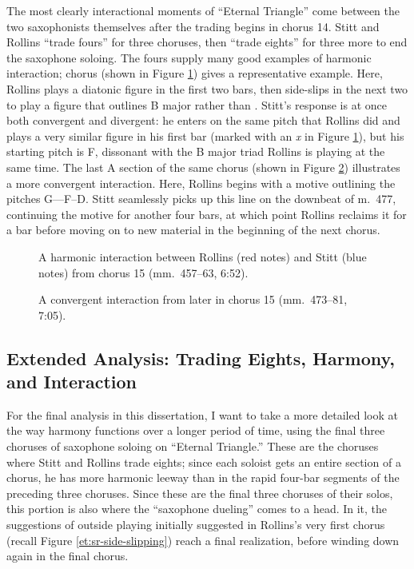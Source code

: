 The most clearly interactional moments of ``Eternal Triangle'' come between
the two saxophonists themselves after the trading begins in chorus 14. Stitt
and Rollins ``trade fours'' for three choruses, then ``trade eights'' for
three more to end the saxophone soloing. The fours supply many good examples
of harmonic interaction; chorus  (shown in Figure
\ref{et:trading-c15-divergent}) gives a representative example. Here, Rollins
plays a diatonic figure in the first two bars, then side-slips in the next two
to play a figure that outlines B major rather than \Bflat. Stitt's response is
at once both convergent and divergent: he enters on the same pitch that
Rollins did and plays a very similar figure in his first bar (marked with an
\textit{x} in Figure \ref{et:trading-c15-divergent}), but his starting pitch
is F\nat, dissonant with the B major triad Rollins is playing at the same
time. The last A section of the same chorus (shown in Figure
\ref{et:trading-c15-convergent}) illustrates a more convergent interaction.
Here, Rollins begins with a motive outlining the pitches G--\Gflat--F--D.
Stitt seamlessly picks up this line on the downbeat of m.~477, continuing the
motive for another four bars, at which point Rollins reclaims it for a bar
before moving on to new material in the beginning of the next chorus.

\vspace{5em}
\begin{figure}[htb]
  \caption[A harmonic interaction between Rollins and Stitt from chorus 15.]{%
    A harmonic interaction between Rollins (red notes) and Stitt (blue notes)
    from chorus 15 (mm.~457--63, 6:52).}
  \label{et:trading-c15-divergent}
\end{figure}

\begin{figure}[htb]
  \caption[A convergent interaction between Rollins and Stitt from later in
  chorus 15.]{%
    A convergent interaction from later in chorus 15 (mm.~473--81, 7:05).}
  \label{et:trading-c15-convergent}
\end{figure}

\newpage
\FloatBarrier
\subsection{Extended Analysis: Trading Eights, Harmony, and Interaction}

For the final analysis in this dissertation, I want to take a more detailed
look at the way harmony functions over a longer period of time, using the
final three choruses of saxophone soloing on ``Eternal Triangle.'' These are
the choruses where Stitt and Rollins trade eights; since each soloist gets an
entire section of a chorus, he has more harmonic leeway than in the rapid
four-bar segments of the preceding three choruses. Since these are the final
three choruses of their solos, this portion is also where the ``saxophone
dueling'' comes to a head. In it, the suggestions of outside playing initially
suggested in Rollins's very first chorus (recall Figure
\ref{et:sr-side-slipping}) reach a final realization, before winding down
again in the final chorus.

